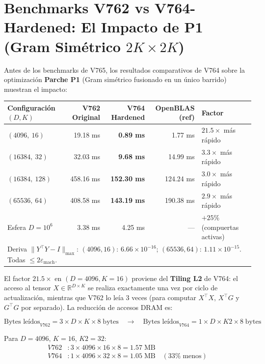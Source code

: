 \section{Benchmarks V762 vs V764-Hardened: El Impacto de P1 (Gram Simétrico $2K \times 2K$)}

Antes de los benchmarks de V765, los resultados comparativos de V764 sobre la optimización
\textbf{Parche P1} (Gram simétrico fusionado en un único barrido) muestran el impacto:


\centering


\begin{tabular}{@{}lrrrl@{}}
\hline
Configuración $(D, K)$ & V762 Original & V764 Hardened & OpenBLAS (ref) & Factor \\
\hline
$(4096,\ 16)$  & 19.18 ms & \textbf{0.89 ms}   & 1.77 ms  & $21.5\times$ más rápido \\
$(16384,\ 32)$ & 32.03 ms & \textbf{9.68 ms}   & 14.99 ms & $3.3\times$ más rápido \\
$(16384,\ 128)$& 458.16 ms & \textbf{152.30 ms} & 124.24 ms & $3.0\times$ más rápido \\
$(65536,\ 64)$ & 408.58 ms & \textbf{143.19 ms} & 190.38 ms & $2.9\times$ más rápido \\
Esfera $D=10^6$ & 3.38 ms & 4.25 ms            & —         & $+25\%$ (compuertas activas) \\
\hline
\multicolumn{5}{l}{\footnotesize Deriva $\|Y^\top Y - I\|_{\max}$: $(4096,16)$: $6.66\times10^{-16}$;
$(65536,64)$: $1.11\times10^{-15}$. Todas $\le 2\varepsilon_{\text{mach}}$.}
\end{tabular}


El factor $21.5\times$ en $(D=4096, K=16)$ proviene del \textbf{Tiling L2} de V764:
el acceso al tensor $X \in \mathbb{R}^{D \times K}$ se realiza exactamente una vez por
ciclo de actualización, mientras que V762 lo leía 3 veces (para computar $X^\top X$,
$X^\top G$ y $G^\top G$ por separado). La reducción de accesos DRAM es:

\begin{equation}
  \text{Bytes leídos}_{V762} = 3 \times D \times K \times 8 \;\text{bytes}
  \quad \longrightarrow \quad
  \text{Bytes leídos}_{V764} = 1 \times D \times K2 \times 8 \;\text{bytes}
\end{equation}

Para $D=4096$, $K=16$, $K2=32$:
\begin{align}
  V762&: 3 \times 4096 \times 16 \times 8 = 1.57\;\text{MB} \\
  V764&: 1 \times 4096 \times 32 \times 8 = 1.05\;\text{MB} \quad (33\%\;\text{menos})
\end{align}

